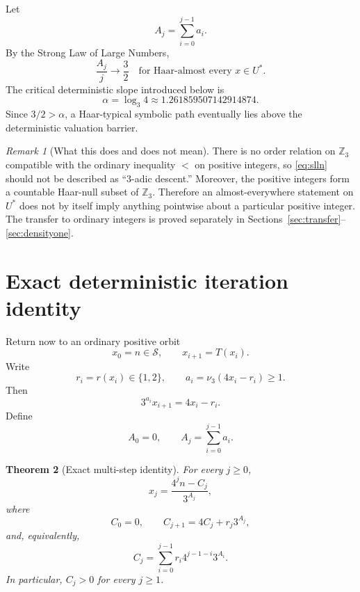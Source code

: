 \documentclass[11pt]{article}
\newtheorem{theorem}{Theorem}[section]
\theoremstyle{definition}
\theoremstyle{remark}
\newtheorem{remark}[theorem]{Remark}
\newcommand{\vthree}{\nu_3}
\newcommand{\Sset}{\mathcal S}
\newcommand{\Ustar}{U^\ast}
\newcommand{\Zthree}{\mathbb Z_3}
\begin{document}
Let
\[
A_j=\sum_{i=0}^{j-1}a_i.
\]
By the Strong Law of Large Numbers,
\begin{equation}
\frac{A_j}{j}\longrightarrow\frac32
\quad\text{for Haar-almost every }x\in\Ustar.
\label{eq:slln}
\end{equation}
The critical deterministic slope introduced below is
\[
\alpha=\log_3 4\approx1.261859507142914874.
\]
Since $3/2>\alpha$, a Haar-typical symbolic path eventually lies above the deterministic valuation barrier.

\begin{remark}[What this does and does not mean]
There is no order relation on $\Zthree$ compatible with the ordinary inequality $<$ on positive integers, so \eqref{eq:slln} should not be described as ``$3$-adic descent.''  Moreover, the positive integers form a countable Haar-null subset of $\Zthree$.  Therefore an almost-everywhere statement on $\Ustar$ does not by itself imply anything pointwise about a particular positive integer.  The transfer to ordinary integers is proved separately in Sections~\ref{sec:transfer}--\ref{sec:densityone}.
\end{remark}

\section{Exact deterministic iteration identity}

Return now to an ordinary positive orbit
\[
x_0=n\in\Sset,\qquad x_{i+1}=T(x_i).
\]
Write
\[
r_i=r(x_i)\in\{1,2\},
\qquad
a_i=\vthree(4x_i-r_i)\ge1.
\]
Then
\begin{equation}
3^{a_i}x_{i+1}=4x_i-r_i.
\label{eq:one-step}
\end{equation}
Define
\begin{equation}
A_0=0,\qquad
A_j=\sum_{i=0}^{j-1}a_i.
\label{eq:Aj}
\end{equation}

\begin{theorem}[Exact multi-step identity]
For every $j\ge0$,
\begin{equation}
\boxed{
x_j=\frac{4^jn-C_j}{3^{A_j}},
}
\label{eq:multistep}
\end{equation}
where
\begin{equation}
C_0=0,\qquad
\boxed{C_{j+1}=4C_j+r_j3^{A_j},}
\label{eq:Crec}
\end{equation}
and, equivalently,
\begin{equation}
\boxed{
C_j=
\sum_{i=0}^{j-1}
r_i4^{j-1-i}3^{A_i}.
}
\label{eq:Cclosed}
\end{equation}
In particular, $C_j>0$ for every $j\ge1$.
\end{theorem}
\end{document}
